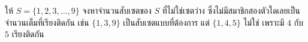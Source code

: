 \question ให้ $S=\{1,2,3,\dots,9\}$ จงหาจำนวนสับเซตของ $S$ ที่ไม่ใช่เซตว่าง ซึ่งไม่มีสมาชิกสองตัวใดเลยเป็นจำนวนเต็มที่เรียงติดกัน
\newline
เช่น $\{1,3,9\}$ เป็นสับเซตแบบที่ต้องการ แต่ $\{1,4,5\}$ ไม่ใช่ เพราะมี $4$ กับ $5$ เรียงติดกัน
\newline
{}
